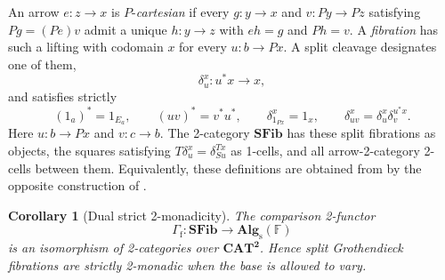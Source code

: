 \documentclass[11pt]{article}
\theoremstyle{plain}
\newtheorem{corollary}[theorem]{Corollary}
\theoremstyle{definition}
\theoremstyle{remark}
\newcommand{\CAT}{\mathbf{CAT}}
\newcommand{\SFib}{\mathbf{SFib}}
\newcommand{\Alg}{\mathbf{Alg}_{\mathrm{s}}}
\numberwithin{equation}{section}
\begin{document}
An arrow $e\colon z\to x$ is $P$-\emph{cartesian}
if every $g\colon y\to x$ and $v\colon Py\to Pz$ satisfying
$Pg=(Pe)v$ admit a unique $h\colon y\to z$ with
$eh=g$ and $Ph=v$.  A \emph{fibration} has such a lifting with
codomain $x$ for every $u\colon b\to Px$.  A split cleavage designates
one of them,
\begin{equation*}
  \delta^x_u\colon u^*x\longrightarrow x,
\end{equation*}
and satisfies strictly
\begin{equation*}
  (1_a)^*=1_{E_a},
  \qquad
  (uv)^*=v^*u^*,
  \qquad
  \delta^x_{1_{Px}}=1_x,
  \qquad
  \delta^x_{uv}=\delta^x_u\delta^{u^*x}_v.
\end{equation*}
Here $u\colon b\to Px$ and $v\colon c\to b$.  The 2-category
$\SFib$ has these split fibrations as objects, the squares satisfying
$T\delta^x_u=\delta^{Tx}_{Su}$ as 1-cells, and all arrow-2-category
2-cells between them.  Equivalently, these definitions are obtained
from  by the opposite construction of
.

\begin{corollary}[Dual strict 2-monadicity]\label{cor:fibration}
The comparison 2-functor
\begin{equation*}
  \Gamma_{\mathrm f}\colon\SFib\longrightarrow\Alg(\mathbb F)
\end{equation*}
is an isomorphism of 2-categories over $\CAT^{\mathbf 2}$.  Hence split
Grothendieck fibrations are strictly 2-monadic when the base is allowed
to vary.
\end{corollary}
\end{document}
